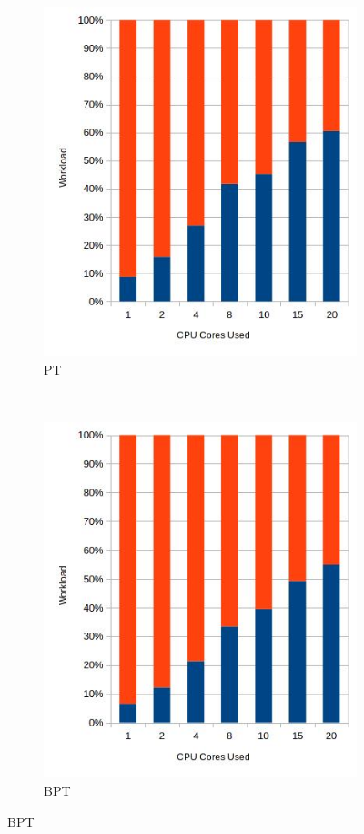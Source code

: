 \begin{figure}[H]

\centering

\begin{subfigure}[h]{0.45\textwidth}
\includegraphics[width=\textwidth]{img/ptwl.jpg}
\caption{\label{img:ptwl} PT}
\end{subfigure}
~
\begin{subfigure}[h]{0.45\textwidth}
\includegraphics[width=\textwidth]{img/bptwl.jpg}
\caption{\label{img:bptwl} BPT}
\end{subfigure}



\end{figure}
